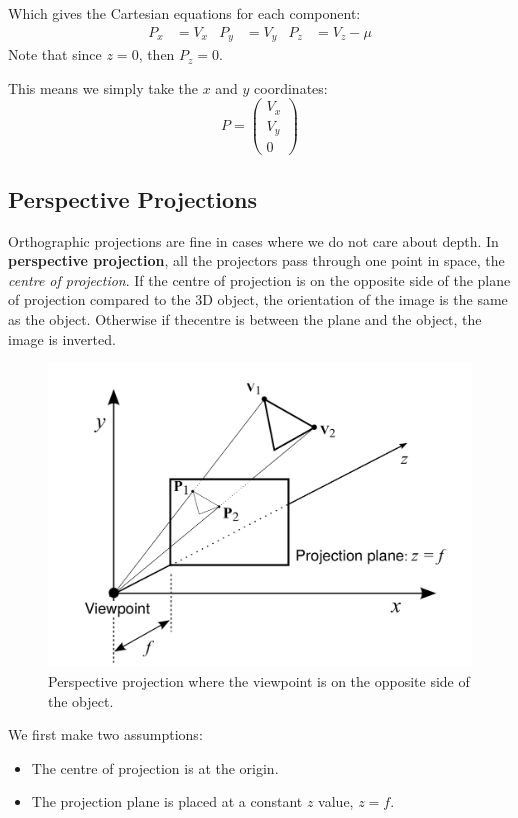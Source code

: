 \documentclass[11pt]{article}
\begin{document}
Which gives the Cartesian equations for each component:
\begin{align*}
  P_x &= V_x  & P_y &= V_y & P_z &= V_z - \mu
\end{align*}
Note that since $z = 0$, then $P_z = 0$.

This means we simply take the $x$ and $y$ coordinates:
\[
  P =
  \begin{pmatrix}
    V_x \\
    V_y \\
    0
  \end{pmatrix}
\]

\subsection{Perspective Projections}
Orthographic projections are fine in cases where we do not care about depth.
In \textbf{perspective projection}, all the projectors pass through one point in space, the \textit{centre of projection}.
If the centre of projection is on the opposite side of the plane of projection compared to the 3D object, the orientation of the image is the same as the object.
Otherwise if thecentre is between the plane and the object, the image is inverted.

\begin{figure}[h]
  \caption{Perspective projection where the viewpoint is on the opposite side of the object.}
  \includegraphics[scale=0.3]{perspective}
  \centering
\end{figure}

We first make two assumptions:
\begin{itemize}
  \item The centre of projection is at the origin.
  \item The projection plane is placed at a constant $z$ value, $z = f$.
\end{itemize}
\end{document}
